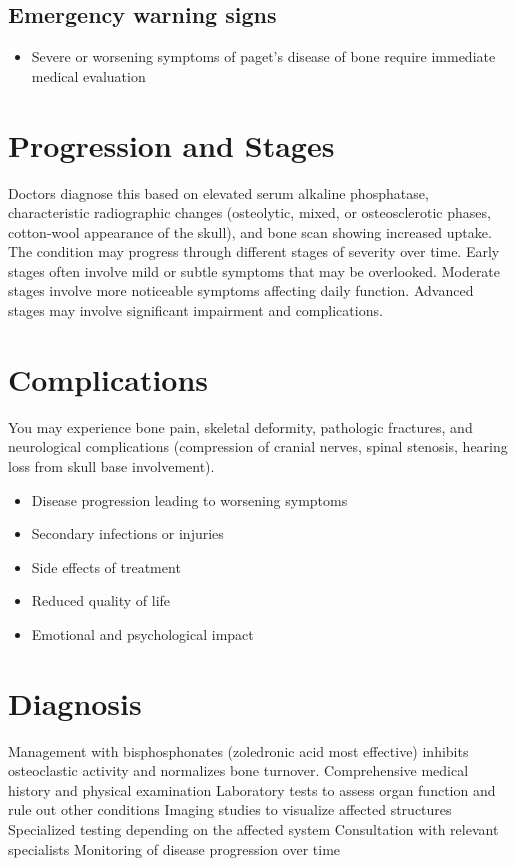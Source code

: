 \subsection{Emergency warning signs}
\begin{itemize}[noitemsep]
  \item Severe or worsening symptoms of paget's disease of bone require immediate medical evaluation
\end{itemize}
\section{Progression and Stages}
Doctors diagnose this based on elevated serum alkaline phosphatase, characteristic radiographic changes (osteolytic, mixed, or osteosclerotic phases, cotton-wool appearance of the skull), and bone scan showing increased uptake. The condition may progress through different stages of severity over time. Early stages often involve mild or subtle symptoms that may be overlooked. Moderate stages involve more noticeable symptoms affecting daily function. Advanced stages may involve significant impairment and complications.
\section{Complications}
You may experience bone pain, skeletal deformity, pathologic fractures, and neurological complications (compression of cranial nerves, spinal stenosis, hearing loss from skull base involvement).

\begin{itemize}[noitemsep]
  \item Disease progression leading to worsening symptoms
  \item Secondary infections or injuries
  \item Side effects of treatment
  \item Reduced quality of life
  \item Emotional and psychological impact
\end{itemize}
\section{Diagnosis}
Management with bisphosphonates (zoledronic acid most effective) inhibits osteoclastic activity and normalizes bone turnover. Comprehensive medical history and physical examination Laboratory tests to assess organ function and rule out other conditions Imaging studies to visualize affected structures Specialized testing depending on the affected system Consultation with relevant specialists Monitoring of disease progression over time

